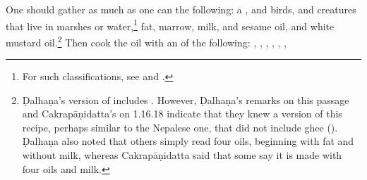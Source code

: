 \begin{translation}
One should gather as much as one can the following: a ,
 and  birds, and creatures that
live in marshes or water,\footnote{For such classifications, see \citet{zimm-1999}
    and \citet{smit-1994}.} fat, marrow, milk, and sesame oil, and white mustard
    oil.\footnote{Ḍalhaṇa's version of  includes .
        However, Ḍalhaṇa's remarks on this passage and Cakrapāṇidatta's on 1.16.18
        \citep[130]{acar-1939} indicate that they knew a version of this recipe, perhaps
        similar to the Nepalese one, that did not include ghee (). Ḍalhaṇa also noted that
        others simply read four oils, beginning with fat and without milk, whereas
        Cakrapāṇidatta said that some say it is made with four oils and milk.} Then cook the oil with an
         of the following: ,
        , %
        , %
        , %
        , %
        , %

\end{translation}
